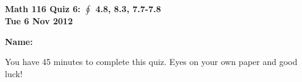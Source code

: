 \documentclass[11pt,letterpaper]{article}
\begin{document}
\flushleft
\begin{multicols}{2}

\begin{large}\textbf{Math 116 Quiz 6: $\oint$ 4.8, 8.3, 7.7-7.8 \\
Tue 6 Nov 2012}\end{large}

\textbf{Name:  }\underline{\hspace{35ex}}

\vspace{.5in}

\end{multicols}

\pagestyle{empty}


\flushleft

You have 45 minutes to complete this quiz.  Eyes on your own paper and good luck!
\end{document}
